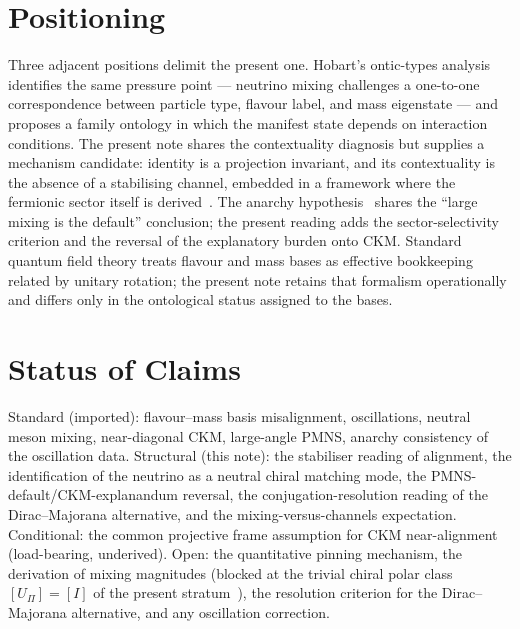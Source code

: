 \documentclass[11pt,a4paper]{article}
\theoremstyle{definition}
\begin{document}
  \section{Positioning}
    \label{sec:positioning}

    Three adjacent positions delimit the present one.
    Hobart's ontic-types analysis~\cite{Hobart2026OnticTypes} identifies the same pressure point --- neutrino
    mixing challenges a one-to-one correspondence between particle type, flavour label, and mass eigenstate ---
    and proposes a family ontology in which the manifest state depends on interaction conditions.
    The present note shares the contextuality diagnosis but supplies a mechanism candidate: identity is a
    projection invariant, and its contextuality is the absence of a stabilising channel, embedded in a framework
    where the fermionic sector itself is derived~\cite{Beau2026q14}.
    The anarchy hypothesis~\cite{HallMurayamaWeiner2000} shares the ``large mixing is the default'' conclusion;
    the present reading adds the sector-selectivity criterion and the reversal of the explanatory burden onto
    CKM.
    Standard quantum field theory treats flavour and mass bases as effective bookkeeping related by unitary
    rotation; the present note retains that formalism operationally and differs only in the ontological status
    assigned to the bases.

  \section{Status of Claims}
    \label{sec:status}

    Standard (imported): flavour--mass basis misalignment, oscillations, neutral meson mixing, near-diagonal
    CKM, large-angle PMNS, anarchy consistency of the oscillation data.
    Structural (this note): the stabiliser reading of alignment, the identification of the neutrino as a neutral
    chiral matching mode, the PMNS-default/CKM-explanandum reversal, the conjugation-resolution reading of the
    Dirac--Majorana alternative, and the mixing-versus-channels expectation.
    Conditional: the common projective frame assumption for CKM near-alignment (load-bearing, underived).
    Open: the quantitative pinning mechanism, the derivation of mixing magnitudes (blocked at the trivial chiral
    polar class $[U_\Pi]=[I]$ of the present stratum~\cite{Beau2026pyo}), the resolution criterion for the
    Dirac--Majorana alternative, and any oscillation correction.
\end{document}
